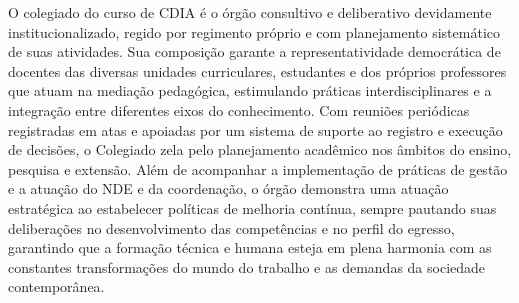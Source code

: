 O colegiado do curso de CDIA é o órgão consultivo e deliberativo devidamente institucionalizado, regido por regimento próprio e com planejamento sistemático de suas atividades. Sua composição garante a representatividade democrática de docentes das diversas unidades curriculares, estudantes e dos próprios professores que atuam na mediação pedagógica, estimulando práticas interdisciplinares e a integração entre diferentes eixos do conhecimento. Com reuniões periódicas registradas em atas e apoiadas por um sistema de suporte ao registro e execução de decisões, o Colegiado zela pelo planejamento acadêmico nos âmbitos do ensino, pesquisa e extensão. Além de acompanhar a implementação de práticas de gestão e a atuação do NDE e da coordenação, o órgão demonstra uma atuação estratégica ao estabelecer políticas de melhoria contínua, sempre pautando suas deliberações no desenvolvimento das competências e no perfil do egresso, garantindo que a formação técnica e humana esteja em plena harmonia com as constantes transformações do mundo do trabalho e as demandas da sociedade contemporânea.